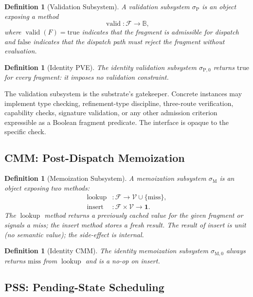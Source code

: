 \documentclass[twocolumn,11pt,a4paper]{article}
\newtheorem{definition}[theorem]{Definition}
\DeclareMathOperator{\valid}{valid}
\DeclareMathOperator{\lookup}{lookup}
\newcommand{\Bool}{\mathbb{B}}
\newcommand{\Frag}{F}
\newcommand{\Vals}{\mathcal{V}}
\newcommand{\Sub}{\sigma}
\newcommand{\Pve}{\Sub_{\mathrm{P}}}
\newcommand{\Cmm}{\Sub_{\mathrm{M}}}
\begin{document}
\begin{definition}[Validation Subsystem]
\label{def:pve}
A \emph{validation subsystem} $\Pve$ is an object exposing a method
\[
\valid : \mathcal{F} \to \Bool,
\]
where $\valid(\Frag) = \mathrm{true}$ indicates that the fragment is admissible for dispatch and $\mathrm{false}$ indicates that the dispatch path must reject the fragment without evaluation.
\end{definition}

\begin{definition}[Identity PVE]
\label{def:noop-pve}
The \emph{identity validation subsystem} $\sigma_{\mathrm{P},0}$ returns $\mathrm{true}$ for every fragment: it imposes no validation constraint.
\end{definition}

The validation subsystem is the substrate's gatekeeper. Concrete instances may implement type checking, refinement-type discipline, three-route verification, capability checks, signature validation, or any other admission criterion expressible as a Boolean fragment predicate. The interface is opaque to the specific check.

\subsection{CMM: Post-Dispatch Memoization}

\begin{definition}[Memoization Subsystem]
\label{def:cmm}
A \emph{memoization subsystem} $\Cmm$ is an object exposing two methods:
\begin{align*}
\lookup &: \mathcal{F} \to \Vals \cup \{\mathrm{miss}\},\\
\text{insert} &: \mathcal{F} \times \Vals \to \mathbf{1}.
\end{align*}
The $\lookup$ method returns a previously cached value for the given fragment or signals a miss; the insert method stores a fresh result. The result of insert is unit (no semantic value); the side-effect is internal.
\end{definition}

\begin{definition}[Identity CMM]
\label{def:noop-cmm}
The \emph{identity memoization subsystem} $\sigma_{\mathrm{M},0}$ always returns $\mathrm{miss}$ from $\lookup$ and is a no-op on insert.
\end{definition}

\subsection{PSS: Pending-State Scheduling}
\end{document}
